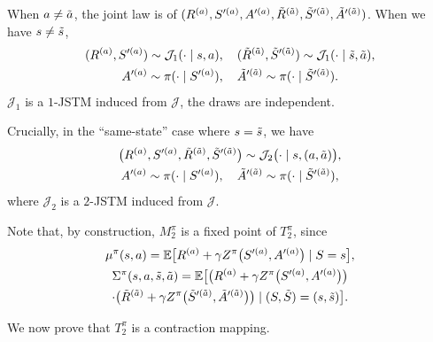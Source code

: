 \documentclass[accepted]{uai2026}
\theoremstyle{plain}
\theoremstyle{definition}
\theoremstyle{remark}
\newcommand{\E}{\mathbb{E}}
\newcommand{\1}{\mathbbm{1}}
\begin{document}
When $a\ne \Tilde{a}$, the joint law is of $(R^{(a)},\allowbreak S'^{(a)},\allowbreak A'^{(a)},\allowbreak \Tilde{R}^{(\Tilde{a})},\allowbreak \Tilde{S}'^{(\Tilde{a})}, \Tilde{A}'^{(\Tilde{a})})$. When we have $s \ne \Tilde{s}$,
\begin{equation}
\begin{gathered}
(R^{(a)}, S'^{(a)}) \sim \mathcal{J}_1(\cdot \mid s, a), \quad (\Tilde{R}^{(\Tilde{a})}, \Tilde{S}'^{(\Tilde{a})}) \sim \mathcal{J}_1(\cdot \mid \Tilde{s}, \Tilde{a}),\\
A'^{(a)} \sim \pi (\cdot \mid S'^{(a)}), \quad \Tilde{A}'^{(\Tilde{a})} \sim \pi(\cdot \mid \Tilde{S}'^{(\Tilde{a})}).
\end{gathered}
\end{equation}
$\mathcal{J}_1$ is a $1$-JSTM induced from $\mathcal{J}$, the draws are independent.

Crucially, in the ``same-state'' case where $s = \Tilde{s}$, we have
\begin{equation}
\begin{gathered}
\big(R^{(a)}, S'^{(a)}, \Tilde{R}^{(\Tilde{a})}, \Tilde{S}'^{(\Tilde{a})}\big) \sim \mathcal{J}_2\big(\cdot \mid s, (a, \Tilde{a})\big),\\
A'^{(a)} \sim \pi (\cdot \mid S'^{(a)}), \quad \Tilde{A}'^{(\Tilde{a})} \sim \pi(\cdot \mid \Tilde{S}'^{(\Tilde{a})}),
\end{gathered}
\end{equation}
where $\mathcal{J}_2$ is a $2$-JSTM induced from $\mathcal{J}$.

Note that, by construction, $M^{\pi}_2$ is a fixed point of $T^\pi_2$, since
\begin{equation}
\begin{gathered}
\mu^\pi(s, a) = \E \big[R^{(a)}+\gamma Z^\pi\big(S'^{(a)},A'^{(a)}\big) \mid S = s \big],\\
\Sigma^\pi(s, a, \Tilde{s},\Tilde{a}) = \E \big[\big(R^{(a)}+\gamma Z^\pi\big(S'^{(a)},A'^{(a)}\big)\big) \\
\cdot\big(\Tilde{R}^{(\Tilde{a})}+\gamma Z^\pi\big(\Tilde{S}'^{(\Tilde{a})},\Tilde{A}'^{(\Tilde{a})}\big)\big)\mid (S, \Tilde{S}) = (s, \Tilde{s}) \big].
\end{gathered}
\end{equation}

We now prove that $T^\pi_2$ is a contraction mapping.
\end{document}
